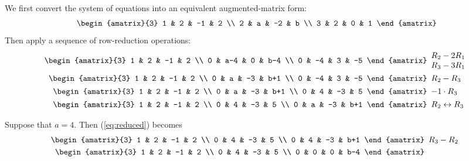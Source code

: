 \documentclass{article}
\begin{document}
We first convert the system of equations into an equivalent augmented-matrix
form:
\[
 \begin{amatrix}{3}
  1 & 2 & -1 & 2 \\
  2 & a & -2 & b \\
  3 & 2 & 0 & 1
 \end{amatrix}
\]
Then apply a sequence of row-reduction operations:
\begin{align}
 \begin{amatrix}{3}
  1 &   2 & -1 &   2 \\
  0 & a-4 &  0 & b-4 \\
  0 &  -4 &  3 &  -5
 \end{amatrix} & \begin{array}{l} R_2 - 2R_1 \\ R_3 - 3R_1 \end{array} 
 \nonumber \\
 \begin{amatrix}{3}
  1 &  2 & -1 &   2 \\
  0 &  a & -3 & b+1 \\
  0 & -4 &  3 &  -5
 \end{amatrix} & \begin{array}{l} R_2 - R_3 \end{array}
 \nonumber \\
 \begin{amatrix}{3}
  1 & 2 & -1 &   2 \\
  0 & a & -3 & b+1 \\
  0 & 4 & -3 &   5
 \end{amatrix} & \begin{array}{l} -1 \cdot R_3 \end{array}
 \nonumber \\
 \begin{amatrix}{3}
  1 & 2 & -1 &   2 \\
  0 & 4 & -3 &   5 \\
  0 & a & -3 & b+1
 \end{amatrix} & \begin{array}{l} R_2 \leftrightarrow R_3 \end{array} 
 \label{eq:reduced}
\end{align}

Suppose that $a = 4$.  Then (\ref{eq:reduced}) becomes
\begin{align}
 \begin{amatrix}{3}
  1 & 2 & -1 &   2 \\
  0 & 4 & -3 &   5 \\
  0 & 4 & -3 & b+1
 \end{amatrix} & \begin{array}{l} R_3 - R_2 \end{array}
 \nonumber \\
 \begin{amatrix}{3}
  1 & 2 & -1 &   2 \\
  0 & 4 & -3 &   5 \\
  0 & 0 &  0 & b-4
 \end{amatrix}
 \label{eq:substitute_a}
\end{align}
\end{document}

